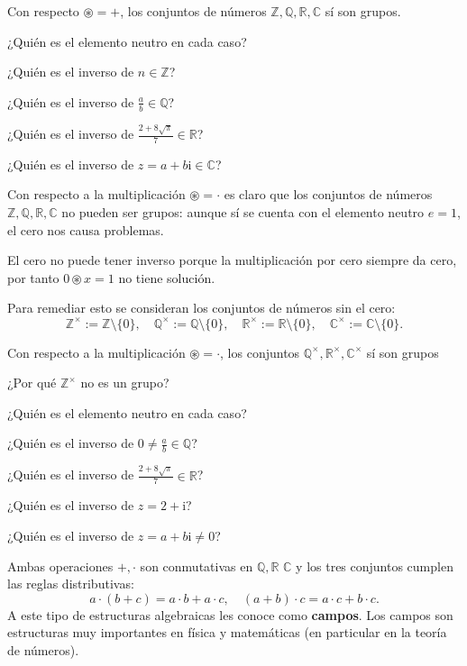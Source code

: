 \begin{ejercicio}
Con respecto $\circledast=+$, los conjuntos de números $\mathbb Z, \mathbb Q, \mathbb R, \mathbb C$ sí son grupos.

¿Quién es el elemento neutro en cada caso?

¿Quién es el inverso de $n\in \mathbb Z$?

¿Quién es el inverso de $\frac{a}{b}\in \mathbb Q$?

¿Quién es el inverso de $\frac{2+8\sqrt{\pi}}{7}\in \mathbb R$?

¿Quién es el inverso de $z=a+b\mathrm{i}\in \mathbb C$?
\end{ejercicio}

Con respecto a la multiplicación $\circledast=\cdot$ es claro que los conjuntos de números $\mathbb Z, \mathbb Q, \mathbb R, \mathbb C$ no pueden ser grupos: aunque sí se cuenta con el elemento neutro  $e=1$, el cero nos causa problemas. 

El cero no puede tener inverso porque la multiplicación por cero siempre da cero, por tanto $0\circledast x=1$ no tiene solución.

Para remediar esto se consideran los conjuntos de números sin el cero:
$$\mathbb Z^{\times}:=\mathbb Z\setminus \{0\}, \quad \mathbb Q^{\times}:=\mathbb Q\setminus \{0\},  \quad \mathbb R^{\times}:=\mathbb R\setminus \{0\},  \quad \mathbb C^{\times}:=\mathbb C\setminus \{0\}.$$

\begin{ejercicio}
Con respecto a la multiplicación $\circledast=\cdot$, los conjuntos $\mathbb Q^{\times}, \mathbb R^{\times}, \mathbb C^{\times}$ sí son grupos 

¿Por qué $\mathbb Z^{\times}$ no es un grupo?

¿Quién es el elemento neutro en cada caso?

¿Quién es el inverso de $0\neq \frac{a}{b}\in \mathbb Q$?

¿Quién es el inverso de $\frac{2+8\sqrt{\pi}}{7}\in \mathbb R$?

¿Quién es el inverso de $z=2+\mathrm{i}$?

¿Quién es el inverso de $z=a+b\mathrm{i}\neq 0$?
\end{ejercicio}

Ambas operaciones $+,\cdot$ son conmutativas en $\mathbb Q, \mathbb R$ $\mathbb C$ y los tres conjuntos cumplen las reglas distributivas: $$a\cdot(b+c)=a\cdot b+a\cdot c, \quad (a+b)\cdot c= a\cdot c+b\cdot c.$$
A este tipo de estructuras algebraicas les conoce como {\bf campos}. Los campos son estructuras muy importantes en física y matemáticas (en particular en la teoría de números).

